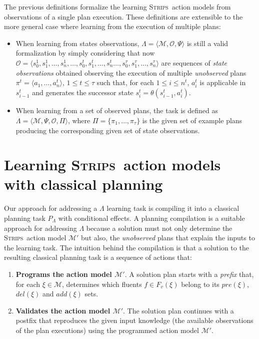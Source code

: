 \documentclass[3p,times]{elsarticle}
\newcommand{\strips}{\textsc{Strips}}     %
\newcommand{\tup}[1]{{\langle #1 \rangle}}
\begin{document}
The previous definitions formalize the learning \strips\ action models from observations of a single plan execution. These definitions are extensible to the more general case where learning from the execution of multiple plans:
\begin{itemize}
  \item When learning from states observations, $\Lambda=\tup{\mathcal{M},\mathcal{O},\Psi}$ is still a valid formalization by simply considering that now $\mathcal{O}=\tup{s_0^1,s_1^1,\ldots,s_{n}^1,\ldots,s_0^t,s_1^t,\ldots,s_{n}^t\ldots,s_0^{\tau},s_1^{\tau},\ldots,s_{n}^{\tau}}$ are sequences of {\em state observations} obtained observing the execution of multiple {\em unobserved} plans $\pi^t=\tup{a_1, \ldots, a_n^t}$, {\tt\small $1\leq t\leq \tau$} such that, for each {\small $1\leq i\leq n^t$}, $a_i^t$ is applicable in $s_{i-1}^t$ and generates the successor state $s_i^t=\theta(s_{i-1}^t,a_i^t)$.
  \item When learning from a set of observed plans, the task is defined as $\Lambda=\tup{\mathcal{M},\Psi,\mathcal{O},\Pi}$, where $\Pi=\{\pi_1,\ldots,\pi_{\tau}\}$ is the given set of example plans producing the corresponding given set of state observations.
\end{itemize}  



\section{Learning \strips\ action models with classical planning}
\label{sec:Section5}
Our approach for addressing a $\Lambda$ learning task is compiling it into a classical planning task $P_{\Lambda}$ with conditional effects. A planning compilation is a suitable approach for addressing $\Lambda$ because a solution must not only determine the \strips\ action model $\mathcal{M}'$ but also, the {\em unobserved} plans that explain the inputs to the learning task. The intuition behind the compilation is that a solution to the resulting classical planning task is a sequence of actions that:

\begin{enumerate}
\item {\bf Programs the action model $\mathcal{M}'$}. A solution plan starts with a {\em prefix} that, for each $\xi\in\mathcal{M}$, determines which fluents $f\in F_v(\xi)$ belong to its $pre(\xi)$, $del(\xi)$ and $add(\xi)$ sets.
\item {\bf Validates the action model $\mathcal{M}'$}. The solution plan continues with a postfix that reproduces the given input knowledge (the available observations of the plan executions) using the programmed action model $\mathcal{M}'$.
\end{enumerate}
\end{document}
